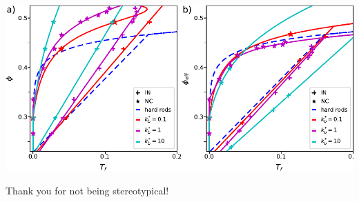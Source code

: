 \documentclass[aspectratio=169]{beamer}
\begin{document}
\begin{frame}[c]{}

  \centering
  \includegraphics[width=\textwidth]{../figures/ch5_soft_from_diss/figs-soft_harm_harm/fig-phase_diag_all/fig-phase_diag_phiHS.pdf}

\end{frame}

\begin{frame}[t]{Thank you for not being stereotypical!}

  \centering

\end{frame}
\end{document}
